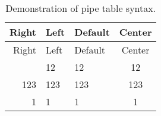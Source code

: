 \documentclass[
]{article}
\begin{document}
\begin{longtable}[]{|r|l|l|c|}
\caption{Demonstration of pipe table syntax.}\tabularnewline
\toprule\noalign{}
Right & Left & Default & Center \\
\midrule\noalign{}
\endfirsthead
\toprule\noalign{}
Right & Left & Default & Center \\
\midrule\noalign{}
\endhead
\bottomrule\noalign{}
\endlastfoot
12 & 12 & 12 & 12 \\
\midrule
123 & 123 & 123 & 123 \\
\midrule
1 & 1 & 1 & 1 \\
\end{longtable}
\end{document}
